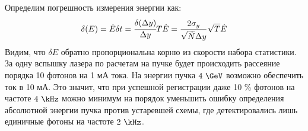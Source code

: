 \vspace{-20pt}
\noindent Определим погрешность измерения энергии как: 
\begin{equation}
\delta(E)= \dot{E} \delta t = \cfrac{\delta(\Delta y)}{\Delta y}T\dot{E} = \frac{2 \sigma_y}{\sqrt{\dot{N}} \Delta y}\sqrt{T}\dot{E}  
\end{equation}
Видим, что $\delta E$ обратно пропорциональна корню из скорости набора статистики. За одну вспышку лазера по расчетам на пучке будет происходить рассеяние порядка 10 фотонов на 1 мА тока. На энергии пучка $4~\GeV$ возможно обеспечить ток в 10 мА. Это значит, что при успешной регистрации даже 10 \% фотонов на частоте $4~\kHz$ можно минимум на порядок уменьшить ошибку определения абсолютной энергии пучка против устаревшей схемы, где детектировались лишь единичные фотоны на частоте $2~\kHz$. 
\par  
 
